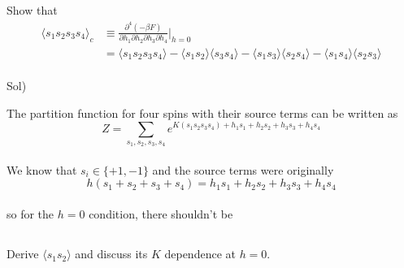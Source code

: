 \documentclass[paper=a4, fontsize=11pt]{scrartcl}
\numberwithin{equation}{section}
\numberwithin{figure}{section}
\numberwithin{table}{section}
\newcommand{\expval}[1]{\langle #1 \rangle}
\newenvironment{problem}{\subsection{}}{}
\newenvironment{solution}{Sol) \begin{adjustwidth}{0.2in}{}\vspace{0.1in}}{\end{adjustwidth}}
\begin{document}
\vskip 0.5in

\begin{problem}
	Show that \\
	\begin{equation}
	\begin{split}
		\expval{s_1s_2s_3s_4}_c &\equiv \frac{\partial^4(-\beta F)}{\partial h_1\partial h_2 \partial h_3 \partial h_4}\Bigr|_{h=0} \\[3pt]
		&= \expval{s_1s_2s_3s_4} - \expval{s_1s_2}\expval{s_3s_4}- \expval{s_1s_3}\expval{s_2s_4}- \expval{s_1s_4}\expval{s_2s_3} \nonumber
	\end{split}
	\end{equation}
\end{problem} \\

\begin{solution}
	The partition function for four spins with their source terms can be written as\\
	\begin{equation}
		Z = \sum_{s_1,s_2,s_3,s_4} e^{K(s_1 s_2 s_3 s_4)+h_1s_1+h_2s_2+h_3s_3+h_4s_4}
	\end{equation}\\
	We know that $s_i \in \{+1,-1\}$ and the source terms were originally
	\begin{equation}
		h(s_1 + s_2 + s_3 + s_4)=h_1s_1+h_2s_2+h_3s_3+h_4s_4
	\end{equation} \\
	so for the $h=0$ condition, there shouldn't be  
\end{solution}

\vskip 0.5in

\begin{problem}
	Derive $\expval{s_1s_2}$ and discuss its $K$ dependence at $h=0$.
\end{problem}\\
\end{document}
